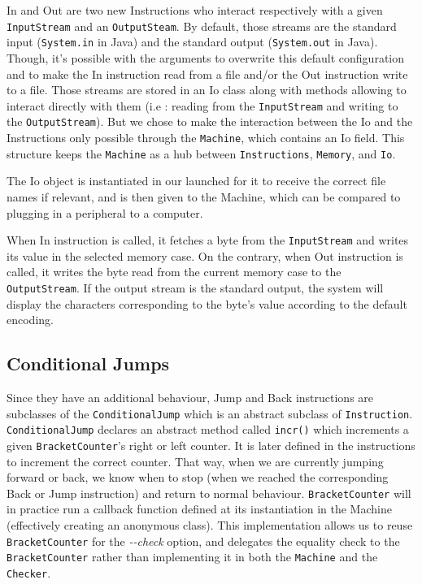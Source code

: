 \documentclass{article}
\begin{document}
In and Out are two new Instructions who interact respectively with a given \texttt{InputStream} and an \texttt{OutputSteam}. By default, those streams are the standard input (\texttt{System.in} in Java) and the standard output (\texttt{System.out} in Java). Though, it's possible with the arguments to overwrite this default configuration and to make the In instruction read from a file and/or the Out instruction write to a file. Those streams are stored in an Io class along with methods allowing to interact directly with them (i.e : reading from the \texttt{InputStream} and writing to the \texttt{OutputStream}). But we chose to make the interaction between the Io and the Instructions only possible through the \texttt{Machine}, which contains an Io field. This structure keeps the \texttt{Machine} as a hub between \texttt{Instructions}, \texttt{Memory}, and \texttt{Io}.

The Io object is instantiated in our launched for it to receive the correct file names if relevant, and is then given to the Machine, which can be compared to plugging in a peripheral to a computer.

When In instruction is called, it fetches a byte from the \texttt{InputStream} and writes its value in the selected memory case. On the contrary, when Out instruction is called, it writes the byte read from the current memory case to the \texttt{OutputStream}. If the output stream is the standard output, the system will display the characters corresponding to the byte's value according to the default encoding.

\subsection{Conditional Jumps}

Since they have an additional behaviour, Jump and Back instructions are subclasses of the \texttt{ConditionalJump} which is an abstract subclass of \texttt{Instruction}. \texttt{ConditionalJump} declares an abstract method called \texttt{incr()} which increments a given \texttt{BracketCounter}'s right or left counter. It is later defined in the instructions to increment the correct counter. That way, when we are currently jumping forward or back, we know when to stop (when we reached the corresponding Back or Jump instruction) and return to normal behaviour. \texttt{BracketCounter} will in practice run a callback function defined at its instantiation in the Machine (effectively creating an anonymous class). This implementation allows us to reuse \texttt{BracketCounter} for the \textit{-{}-check} option, and delegates the equality check to the \texttt{BracketCounter} rather than implementing it in both the \texttt{Machine} and the \texttt{Checker}.
\end{document}
